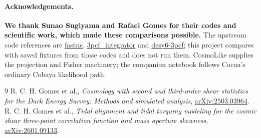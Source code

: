 \documentclass[11pt]{article}
\newcommand{\us}{\_\allowbreak}
\begin{document}
\paragraph{Acknowledgements.}
\textbf{We thank Sunao Sugiyama and Rafael Gomes for their codes and scientific
work, which made these comparisons possible.} The upstream code references are
\href{https://github.com/git-sunao/fastnc}{fastnc},
\href{https://github.com/rchgomes/3pcf_integrator}{3pcf\us integrator} and
\href{https://github.com/rchgomes/desy6-3pcf}{desy6-3pcf}; this project
compares with saved fixtures from those codes and does not run them.
CosmoLike supplies the projection and Fisher machinery; the companion
notebook follows Cocoa's ordinary Cobaya likelihood path.

\begin{thebibliography}{9}
 R. C. H. Gomes et al., \emph{Cosmology with second and third-order
shear statistics for the Dark Energy Survey: Methods and simulated analysis},
\href{https://arxiv.org/abs/2503.03964}{arXiv:2503.03964}.
 R. C. H. Gomes et al., \emph{Tidal alignment and tidal torquing modeling
for the cosmic shear three-point correlation function and mass aperture skewness},
\href{https://arxiv.org/abs/2601.09133}{arXiv:2601.09133}.
\end{thebibliography}
\end{document}
